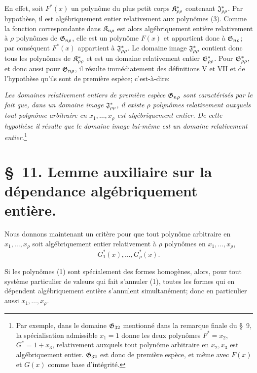 En effet, soit $F^*(x)$ un polynôme du plus petit corps $\mathfrak{K}^*_{\rho\rho}$ contenant $\mathfrak{J}^*_{\rho\rho}$. Par hypothèse, il est algébriquement entier relativement aux polynômes (3). Comme la fonction correspondante dans $\mathfrak{K}_{n\rho}$ est alors algébriquement entière relativement à $\rho$ polynômes de $\mathfrak{G}_{n\rho}$, elle est un polynôme $F(x)$ et appartient donc à $\mathfrak{G}_{n\rho}$; par conséquent $F^*(x)$ appartient à $\mathfrak{J}^*_{\rho\rho}$. Le domaine image $\mathfrak{J}^*_{\rho\rho}$ contient donc tous les polynômes de $\mathfrak{K}^*_{\rho\rho}$ et est un domaine relativement entier $\mathfrak{G}^*_{\rho\rho}$. Pour $\mathfrak{G}^*_{\rho\rho}$, et donc aussi pour $\mathfrak{G}_{n\rho}$, il résulte immédiatement des définitions V et VII et de l'hypothèse qu'ils sont de première espèce; c'est-à-dire:

\emph{Les domaines relativement entiers de première espèce $\mathfrak{G}_{n\rho}$ sont caractérisés par le fait que, dans un domaine image $\mathfrak{J}^*_{\rho\rho}$, il existe $\rho$ polynômes relativement auxquels tout polynôme arbitraire en $x_1,\ldots,x_\rho$ est algébriquement entier. De cette hypothèse il résulte que le domaine image lui-même est un domaine relativement entier.}\footnote{Par exemple, dans le domaine $\mathfrak{G}_{32}$ mentionné dans la remarque finale du \S\ 9, la spécialisation admissible $x_1=1$ donne les deux polynômes $F^*=x_2$, $G^*=1+x_3$, relativement auxquels tout polynôme arbitraire en $x_2,x_3$ est algébriquement entier. $\mathfrak{G}_{32}$ est donc de première espèce, et même avec $F(x)$ et $G(x)$ comme base d'intégrité.}

\section*{\S\ 11. Lemme auxiliaire sur la dépendance algébriquement entière.}

Nous donnons maintenant un critère pour que tout polynôme arbitraire en $x_1,\ldots,x_\rho$ soit algébriquement entier relativement à $\rho$ polynômes en $x_1,\ldots,x_\rho$,
\begin{equation}
  G_1^*(x),\ldots,G_\rho^*(x).
\tag{1}
\end{equation}

Si les polynômes (1) sont spécialement des formes homogènes, alors, pour tout système particulier de valeurs qui fait s'annuler (1), toutes les formes qui en dépendent algébriquement entière s'annulent simultanément; donc en particulier aussi $x_1,\ldots,x_\rho$.

